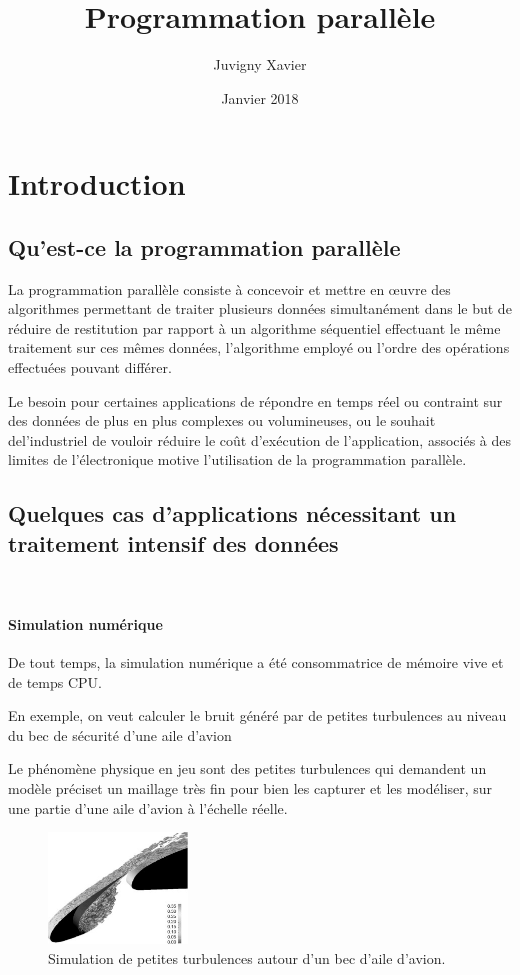 \documentclass[fleqn,11pt]{article}
\title{Programmation parallèle}
\author{Juvigny Xavier}
\date{Janvier 2018}
\begin{document}
\maketitle
\tableofcontents

\section{Introduction}

\subsection{Qu'est-ce la programmation parallèle}

La programmation parallèle consiste à concevoir et mettre en œuvre des algorithmes permettant de traiter plusieurs données simultanément dans le but de réduire de restitution par rapport à un algorithme séquentiel effectuant le même traitement sur ces mêmes données, l'algorithme employé ou l'ordre des opérations effectuées pouvant différer. 

Le besoin pour certaines applications de répondre en temps réel ou contraint sur des données de plus en plus complexes ou volumineuses, ou le souhait del'industriel de vouloir réduire le coût d'exécution de l'application, associés à des limites de l'électronique motive l'utilisation de la programmation parallèle. 

\subsection{Quelques cas d'applications nécessitant un traitement intensif des données}
\
\paragraph{Simulation numérique }

De tout temps, la simulation numérique a été consommatrice de mémoire vive et de temps CPU. 

En exemple, on veut calculer le bruit généré par de petites turbulences au niveau du bec de sécurité d'une aile d'avion

Le phénomène physique en jeu sont des petites turbulences qui demandent un modèle préciset un maillage très fin pour bien les capturer
et les modéliser, sur une partie d'une aile d'avion à l'échelle réelle.

\begin{figure}[h]
\begin{center}
\includegraphics[width=0.33\textwidth]{SlatWingTurb1}
\caption{Simulation de petites turbulences autour d'un bec d'aile d'avion.}
\end{center}
\end{figure}
\end{document}
